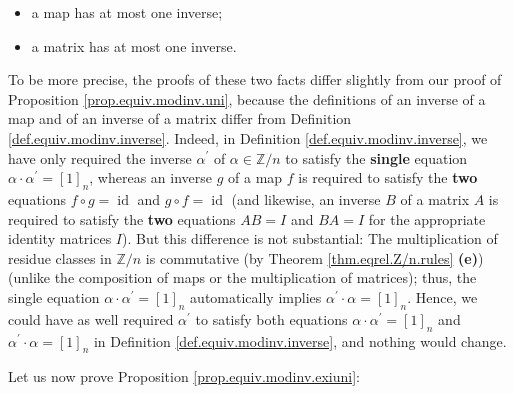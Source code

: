 \documentclass[numbers=enddot,12pt,final,onecolumn,notitlepage]{scrartcl}%
\numberwithin{exer}{subsection}
\theoremstyle{definition}
\begin{document}
\begin{itemize}
\item a map has at most one inverse;

\item a matrix has at most one inverse.
\end{itemize}

\noindent To be more precise, the proofs of these two facts differ slightly
from our proof of Proposition \ref{prop.equiv.modinv.uni}, because the
definitions of an inverse of a map and of an inverse of a matrix differ from
Definition \ref{def.equiv.modinv.inverse}. Indeed, in Definition
\ref{def.equiv.modinv.inverse}, we have only required the inverse
$\alpha^{\prime}$ of $\alpha\in\mathbb{Z}/n$ to satisfy the \textbf{single}
equation $\alpha\cdot\alpha^{\prime}=\left[  1\right]  _{n}$, whereas an
inverse $g$ of a map $f$ is required to satisfy the \textbf{two} equations
$f\circ g=\operatorname*{id}$ and $g\circ f=\operatorname*{id}$ (and likewise,
an inverse $B$ of a matrix $A$ is required to satisfy the \textbf{two}
equations $AB=I$ and $BA=I$ for the appropriate identity matrices $I$). But
this difference is not substantial: The multiplication of residue classes in
$\mathbb{Z}/n$ is commutative (by Theorem \ref{thm.eqrel.Z/n.rules}
\textbf{(e)}) (unlike the composition of maps or the multiplication of
matrices); thus, the single equation $\alpha\cdot\alpha^{\prime}=\left[
1\right]  _{n}$ automatically implies $\alpha^{\prime}\cdot\alpha=\left[
1\right]  _{n}$. Hence, we could have as well required $\alpha^{\prime}$ to
satisfy both equations $\alpha\cdot\alpha^{\prime}=\left[  1\right]  _{n}$ and
$\alpha^{\prime}\cdot\alpha=\left[  1\right]  _{n}$ in Definition
\ref{def.equiv.modinv.inverse}, and nothing would change.

Let us now prove Proposition \ref{prop.equiv.modinv.exiuni}:
\end{document}
